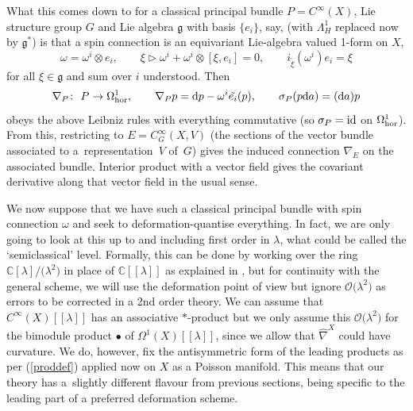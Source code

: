 \documentclass[pdftex]{sigma}
\numberwithin{equation}{section}
\newcommand{\C}{{\mathbb{C}}}
\newcommand{\<}{{\langle}}
\renewcommand{\>}{{\rangle}}
\newcommand{\tens}{\otimes}
\newcommand{\id}{{\rm id}}
\newcommand{\extd}{{\rm d}}
\newcommand{\la}{{\triangleright}}
\newcommand{\cg}{{\mathfrak{g}}}
\begin{document}
What this comes down to for a classical principal bundle $P=C^\infty(X)$, Lie structure group $G$ and Lie algebra $\cg$ with basis $\{e_i\}$, say, (with $\Lambda^1_H$ replaced now by $\cg^*$) is that a spin connection is an equivariant Lie-algebra valued 1-form on $X$,
 \begin{equation}\label{classomega} \omega=\omega^i\tens e_i,\qquad \xi\la \omega^i+\omega^i\tens [\xi,e_i]=0,\qquad i_{\tilde\xi}(\omega^i) e_i=\xi\end{equation}
 for all $\xi\in\cg$ and sum over $i$ understood. Then
\begin{equation}\label{classnabla}\nabla_P\colon \ P\to \Omega^1_{\rm hor},\qquad \nabla_Pp= \extd p- \omega^i\tilde{e_i}(p),\qquad \sigma_P(p\extd a)=(\extd a)p\end{equation}
obeys the above Leibniz rules with everything commutative (so $\sigma_P=\id$ on $\Omega^1_{\rm hor}$). From this, restricting to $E=C^\infty_G(X,V)$ (the sections of the vector bundle associated to a~representation~$V$ of~$G$) gives the induced connection $\nabla_E$ on the associated bundle. Interior product with a vector field gives the covariant derivative along that vector field in the usual sense.

We now suppose that we have such a classical principal bundle with spin connection $\omega$ and seek to deformation-quantise everything. In fact, we are only going to look at this up to and including first order in $\lambda$, what could be called the `semiclassical' level. Formally, this can be done by working over the ring $\C[\lambda]/\big(\lambda^2\big)$ in place of $\C[[\lambda]]$ as explained in \cite{BegMa:prg}, but for continuity with the general scheme, we will use the deformation point of view but ignore $\mathcal{O}\big(\lambda^2\big)$ as errors to be corrected in a 2nd order theory. We can assume that $C^\infty(X)[[\lambda]]$ has an associative $*$-product but we only assume this $\mathcal{O}\big(\lambda^2\big)$ for the bimodule product $\bullet$ of $\Omega^1(X)[[\lambda]]$, since we allow that $\hat\nabla^X$ could have curvature. We do, however, fix the antisymmetric form of the leading products as per (\ref{proddef}) applied now on $X$ as a Poisson manifold. This means that our theory has a~slightly different flavour from previous sections, being specific to the leading part of a preferred deformation scheme.
\end{document}

